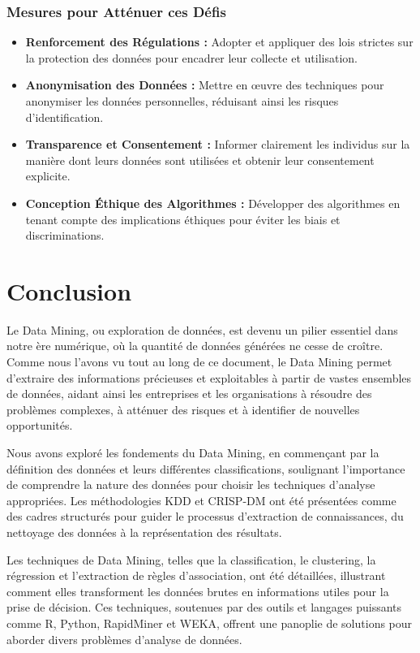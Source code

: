 \documentclass[a4paper,12pt]{article}
\begin{document}
		\subsubsection{Mesures pour Atténuer ces Défis}
			\begin{itemize}
				\item \textbf{Renforcement des Régulations :} Adopter et appliquer des lois strictes sur la protection des données pour encadrer leur collecte et utilisation.
				\item \textbf{Anonymisation des Données :} Mettre en œuvre des techniques pour anonymiser les données personnelles, réduisant ainsi les risques d'identification.
				\item \textbf{Transparence et Consentement :} Informer clairement les individus sur la manière dont leurs données sont utilisées et obtenir leur consentement explicite.
				\item \textbf{Conception Éthique des Algorithmes :} Développer des algorithmes en tenant compte des implications éthiques pour éviter les biais et discriminations.
			\end{itemize}

    \newpage
     \section*{Conclusion}
Le Data Mining, ou exploration de données, est devenu un pilier essentiel dans notre ère numérique, où la quantité de données générées ne cesse de croître. Comme nous l'avons vu tout au long de ce document, le Data Mining permet d'extraire des informations précieuses et exploitables à partir de vastes ensembles de données, aidant ainsi les entreprises et les organisations à résoudre des problèmes complexes, à atténuer des risques et à identifier de nouvelles opportunités.

Nous avons exploré les fondements du Data Mining, en commençant par la définition des données et leurs différentes classifications, soulignant l'importance de comprendre la nature des données pour choisir les techniques d'analyse appropriées. Les méthodologies KDD et CRISP-DM ont été présentées comme des cadres structurés pour guider le processus d'extraction de connaissances, du nettoyage des données à la représentation des résultats.

Les techniques de Data Mining, telles que la classification, le clustering, la régression et l'extraction de règles d'association, ont été détaillées, illustrant comment elles transforment les données brutes en informations utiles pour la prise de décision. Ces techniques, soutenues par des outils et langages puissants comme R, Python, RapidMiner et WEKA, offrent une panoplie de solutions pour aborder divers problèmes d'analyse de données.
\end{document}
